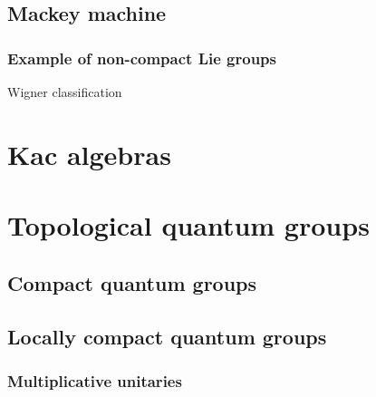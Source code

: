 \documentclass{../note}
\begin{document}
\chapter{Mackey machine}
\section{Example of non-compact Lie groups}
Wigner classification








\part{Kac algebras}





\part{Topological quantum groups}
\chapter{Compact quantum groups}
\chapter{Locally compact quantum groups}
\section{Multiplicative unitaries}
\end{document}
